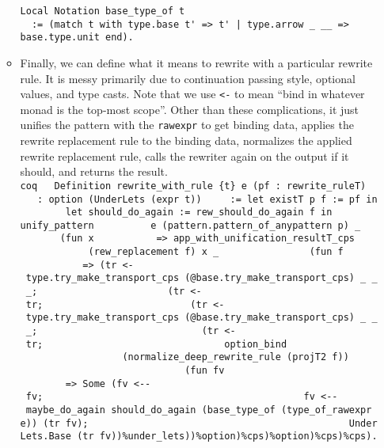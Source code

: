 \begin{itemize}
\begin{itemize}
\begin{verbatim}
Local Notation base_type_of t
  := (match t with type.base t' => t' | type.arrow _ __ => base.type.unit end).
\end{verbatim}
  \item
    Finally, we can define what it means to rewrite with a particular
    rewrite rule. It is messy primarily due to continuation passing
    style, optional values, and type casts. Note that we use
    \texttt{\textless{}-} to mean ``bind in whatever monad is the
    top-most scope''. Other than these complications, it just unifies
    the pattern with the \texttt{rawexpr} to get binding data, applies
    the rewrite replacement rule to the binding data, normalizes the
    applied rewrite replacement rule, calls the rewriter again on the
    output if it should, and returns the result.
    \texttt{coq\ \ \ Definition\ rewrite\_with\_rule\ \{t\}\ e\textquotesingle{}\ (pf\ :\ rewrite\_ruleT)\ \ \ ~\ :\ option\ (UnderLets\ (expr\ t))\ \ \ ~\ :=\ let\ \textquotesingle{}existT\ p\ f\ :=\ pf\ in\ \ \ ~\ ~\ ~let\ should\_do\_again\ :=\ rew\_should\_do\_again\ f\ in\ \ \ ~\ ~\ ~unify\_pattern\ \ \ ~\ ~\ ~\ ~e\textquotesingle{}\ (pattern.pattern\_of\_anypattern\ p)\ \_\ \ \ ~\ ~\ ~\ ~(fun\ x\ \ \ ~\ ~\ ~\ ~\ =\textgreater{}\ app\_with\_unification\_resultT\_cps\ \ \ ~\ ~\ ~\ ~\ ~\ ~\ ~(rew\_replacement\ f)\ x\ \_\ \ \ ~\ ~\ ~\ ~\ ~\ ~\ ~(fun\ f\textquotesingle{}\ \ \ ~\ ~\ ~\ ~\ ~\ ~\ ~\ =\textgreater{}\ (tr\ \textless{}-\ type.try\_make\_transport\_cps\ (@base.try\_make\_transport\_cps)\ \_\ \_\ \_;\ \ \ ~\ ~\ ~\ ~\ ~\ ~\ ~\ ~\ ~\ ~\ (tr\ \textless{}-\ tr;\ \ \ ~\ ~\ ~\ ~\ ~\ ~\ ~\ ~\ ~\ ~\ ~\ ~(tr\textquotesingle{}\ \textless{}-\ type.try\_make\_transport\_cps\ (@base.try\_make\_transport\_cps)\ \_\ \_\ \_;\ \ \ ~\ ~\ ~\ ~\ ~\ ~\ ~\ ~\ ~\ ~\ ~\ ~\ ~\ (tr\textquotesingle{}\ \textless{}-\ tr\textquotesingle{};\ \ \ ~\ ~\ ~\ ~\ ~\ ~\ ~\ ~\ ~\ ~\ ~\ ~\ ~\ ~\ ~option\_bind\textquotesingle{}\ \ \ ~\ ~\ ~\ ~\ ~\ ~\ ~\ ~\ ~\ ~\ ~\ ~\ ~\ ~\ ~\ ~(normalize\_deep\_rewrite\_rule\ (projT2\ f\textquotesingle{}))\ \ \ ~\ ~\ ~\ ~\ ~\ ~\ ~\ ~\ ~\ ~\ ~\ ~\ ~\ ~\ ~\ ~(fun\ fv\ \ \ ~\ ~\ ~\ ~\ ~\ ~\ ~\ ~\ ~\ ~\ ~\ ~\ ~\ ~\ ~\ ~\ =\textgreater{}\ Some\ (fv\ \textless{}-\/-\ fv;\ \ \ ~\ ~\ ~\ ~\ ~\ ~\ ~\ ~\ ~\ ~\ ~\ ~\ ~\ ~\ ~\ ~\ ~\ ~\ ~\ ~\ ~\ ~fv\ \textless{}-\/-\ maybe\_do\_again\ should\_do\_again\ (base\_type\_of\ (type\_of\_rawexpr\ e\textquotesingle{}))\ (tr\ fv);\ \ \ ~\ ~\ ~\ ~\ ~\ ~\ ~\ ~\ ~\ ~\ ~\ ~\ ~\ ~\ ~\ ~\ ~\ ~\ ~\ ~\ ~\ ~UnderLets.Base\ (tr\textquotesingle{}\ fv))\%under\_lets))\%option)\%cps)\%option)\%cps)\%cps).}


\end{itemize}
\end{itemize}
